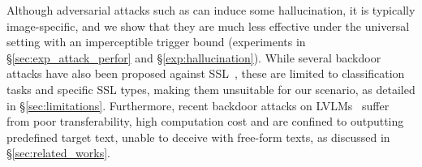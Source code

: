 Although adversarial attacks such as \cite{zhao2024evaluating} can induce some hallucination, it is typically image-specific, and we show that they are much less effective under the universal setting with an imperceptible trigger bound (experiments in \S\ref{sec:exp_attack_perfor} and \S\ref{exp:hallucination}). While several backdoor attacks have also been proposed against SSL~\cite{liang2024badclip,carlini2021poisoning,jia2022badencoder,tao2023distribution}, these are limited to classification tasks and specific SSL types, making them unsuitable for our scenario, as detailed in \S\ref{sec:limitations}. Furthermore, recent backdoor attacks on LVLMs~\cite{lu2024test,lyu2024backdooring,tao2024imgtrojan,xu2024shadowcast} suffer from poor transferability, high computation cost and are confined to outputting predefined target text, unable to deceive with free-form texts, as discussed in \S\ref{sec:related_works}.

